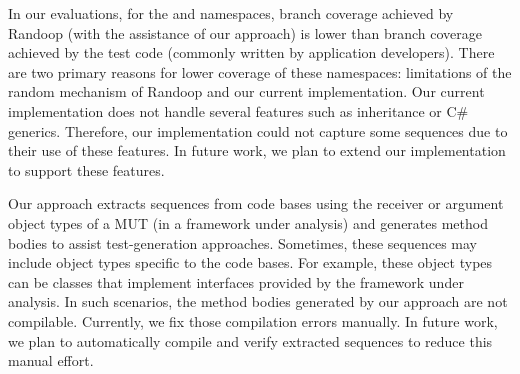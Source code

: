 \documentclass{sig-alternate}
\begin{document}
In our evaluations, for the  and  namespaces, branch coverage achieved by Randoop (with the assistance of our approach) is lower than branch coverage achieved by the test code (commonly written by  application developers). There are two primary reasons for lower coverage of these namespaces: limitations of the random mechanism of Randoop and our current implementation. Our current implementation does not handle several features such as inheritance or C\# generics. Therefore, our implementation could not capture some sequences due to their use of these features. In future work, we plan to extend our implementation to support these features. 


Our approach extracts sequences from code bases using the receiver or argument object types of a MUT (in a framework under analysis) and generates method bodies to assist test-generation approaches. Sometimes, these sequences may include object types specific to the code bases. For example, these object types can be classes that implement interfaces provided by the framework under analysis. In such scenarios, the method bodies generated by our approach are not compilable. Currently, we fix those compilation errors manually. In future work, we plan to automatically compile and verify extracted sequences to reduce this manual effort.

\end{document}
